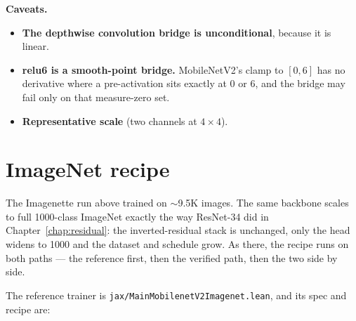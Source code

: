 \medskip\noindent\textbf{Caveats.}
\begin{itemize}
  \item \textbf{The depthwise convolution bridge is unconditional}, because
    it is linear.
  \item \textbf{relu6 is a smooth-point bridge.} MobileNetV2's clamp to
    $[0,6]$ has no derivative where a pre-activation sits exactly at $0$ or
    $6$, and the bridge may fail only on that measure-zero set.
  \item \textbf{Representative scale} (two channels at $4\times4$).
\end{itemize}

\section{ImageNet recipe}
\label{sec:mnv2_imagenet}

The Imagenette run above trained on $\sim$9.5K images. The same backbone
scales to full 1000-class ImageNet exactly the way ResNet-34 did in
Chapter~\ref{chap:residual}: the inverted-residual stack is unchanged, only
the head widens to 1000 and the dataset and schedule grow. As there, the
recipe runs on both paths --- the reference first, then the verified path,
then the two side by side.


The reference trainer is \texttt{jax/MainMobilenetV2Imagenet.lean}, and its
spec and recipe are:

